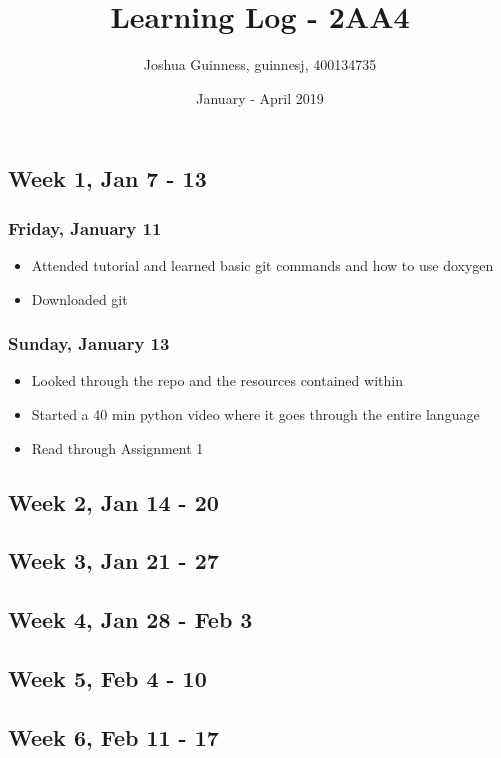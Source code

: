 \documentclass{article}
\title{Learning Log - 2AA4}
\author{Joshua Guinness, guinnesj, 400134735}
\date{January - April 2019}
\begin{document}
\maketitle

\subsection{Week 1, Jan 7 - 13}

\subsubsection{Friday, January 11}
\begin{itemize}
    \item Attended tutorial and learned basic git commands and how to use doxygen
    \item Downloaded git
\end{itemize}

\subsubsection{Sunday, January 13}
\begin{itemize}
    \item Looked through the repo and the resources contained within
    \item Started a 40 min python video where it goes through the entire language
    \item Read through Assignment 1
\end{itemize}

\subsection{Week 2, Jan 14 - 20}

\subsection{Week 3, Jan 21 - 27}

\subsection{Week 4, Jan 28 - Feb 3}

\subsection{Week 5, Feb 4 - 10}

\subsection{Week 6, Feb 11 - 17}
\end{document}
